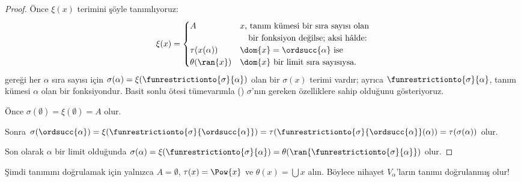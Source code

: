 \documentclass[../../../include/open-logic-section]{subfiles}
\begin{document}
\begin{proof}
Önce $\xi(x)$ terimini şöyle tanımlıyoruz:
\[
	\xi(x) =
	\begin{cases}
			A &\text{$x$, tanım kümesi bir sıra sayısı olan}\\
			&\hspace{1em}\text{bir fonksiyon değilse; aksi hâlde:}\\
			\tau(x(\alpha)) & \text{$\dom{x} = \ordsucc{\alpha}$ ise}\\
			\theta(\ran{x}) & \text{$\dom{x}$ bir limit sıra sayısıysa.}
	\end{cases}
\]
 gereği her $\alpha$ sıra sayısı için
$\sigma(\alpha)=\xi(\funrestrictionto{\sigma}{\alpha})$ olan bir
$\sigma(x)$ terimi vardır; ayrıca
$\funrestrictionto{\sigma}{\alpha}$, tanım kümesi $\alpha$ olan bir
fonksiyondur. Basit sonlu ötesi tümevarımla
() $\sigma$'nın gereken
özelliklere sahip olduğunu gösteriyoruz.

Önce $\sigma(\emptyset)=\xi(\emptyset)=A$ olur.

Sonra $\sigma(\ordsucc{\alpha})=
\xi(\funrestrictionto{\sigma}{\ordsucc{\alpha}})=
\tau(\funrestrictionto{\sigma}{\ordsucc{\alpha}}(\alpha))=
\tau(\sigma(\alpha))$ olur.

Son olarak $\alpha$ bir limit olduğunda
$\sigma(\alpha)=\xi(\funrestrictionto{\sigma}{\alpha})=
\theta(\ran{\funrestrictionto{\sigma}{\alpha}})$ olur.
\end{proof}
\noindent
Şimdi  tanımını doğrulamak için yalnızca
$A=\emptyset$, $\tau(x)=\Pow{x}$ ve $\theta(x)=\bigcup x$ alın. Böylece
nihayet $V_\alpha$'ların tanımı doğrulanmış olur!{}
\end{document}
